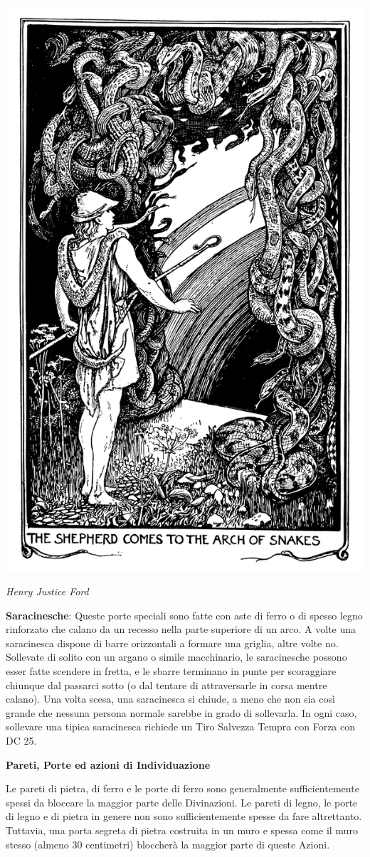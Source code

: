 \begin{multicols}{2}
\begin{center}
	\includegraphics[width=0.7\linewidth]{immagini/arcoserpenti.png}

	\emph{Henry Justice Ford}
\end{center}

\textbf{Saracinesche}: Queste porte speciali sono fatte con aste di ferro o di spesso legno rinforzato che calano da un recesso nella parte superiore di un arco. A volte una saracinesca dispone di barre orizzontali a formare una griglia, altre volte no. Sollevate di solito con un argano o simile macchinario, le saracinesche possono esser fatte scendere in fretta, e le sbarre terminano in punte per scoraggiare chiunque dal passarci sotto (o dal tentare di attraversarle in corsa mentre calano). Una volta scesa, una saracinesca si chiude, a meno che non sia così grande che nessuna persona normale sarebbe in grado di sollevarla. In ogni caso, sollevare una tipica saracinesca richiede un Tiro Salvezza Tempra con Forza con DC 25.

\textbf{Pareti, Porte ed azioni di Individuazione}

Le pareti di pietra, di ferro e le porte di ferro sono generalmente sufficientemente spessi da bloccare la maggior parte delle Divinazioni. Le pareti di legno, le porte di legno e di pietra in genere non sono sufficientemente spesse da fare altrettanto. Tuttavia, una porta segreta di pietra costruita in un muro e spessa come il muro stesso (almeno 30 centimetri) bloccherà la maggior parte di queste Azioni.


\end{multicols}
